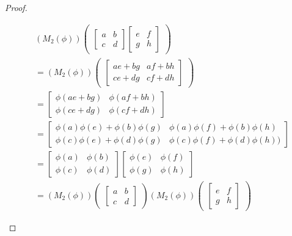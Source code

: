 \documentclass[12pt, psamsfonts]{amsart}
\theoremstyle{definition}
\theoremstyle{remark}
\numberwithin{equation}{section}
\begin{document}
\begin{proof}
\begin{itemize}
     \begin{align*}
       &(M_2(\phi))\begin{pmatrix}\begin{bmatrix} a & b \\ c & d \end{bmatrix} \begin{bmatrix} e & f \\ g & h \end{bmatrix} \end{pmatrix} \\
         &= (M_2(\phi))\begin{pmatrix}\begin{bmatrix} ae + bg & af + bh \\ ce + dg & cf + dh \end{bmatrix} \end{pmatrix} \\
         &= \begin{bmatrix} \phi(ae + bg) & \phi(af + bh) \\ \phi(ce + dg) & \phi(cf + dh) \end{bmatrix} \\
         &= \begin{bmatrix} \phi(a)\phi(e) + \phi(b)\phi(g) & \phi(a)\phi(f) + \phi(b)\phi(h) \\ \phi(c)\phi(e) + \phi(d)\phi(g) & \phi(c)\phi(f) + \phi(d)\phi(h)) \end{bmatrix} \\
         &= \begin{bmatrix} \phi(a) & \phi(b) \\ \phi(c) & \phi(d) \end{bmatrix} \begin{bmatrix} \phi(e) & \phi(f) \\ \phi(g) & \phi(h) \end{bmatrix} \\
         &= (M_2(\phi))\begin{pmatrix}\begin{bmatrix} a & b \\ c & d \end{bmatrix} \end{pmatrix} (M_2(\phi))\begin{pmatrix}\begin{bmatrix} e & f \\ g & h \end{bmatrix} \end{pmatrix}
     \end{align*}

\end{itemize}
\end{proof}
\end{document}
